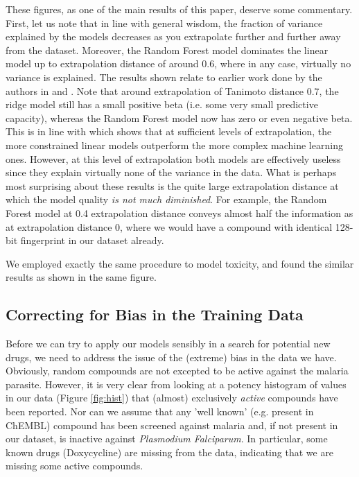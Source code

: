 \documentclass{article}
\begin{document}
These figures, as one of the main results of this paper, deserve some commentary. First, let us note that in line with general wisdom, the fraction of variance explained by the models decreases as you extrapolate further and further away from the dataset.  Moreover, the Random Forest model dominates the linear model up to extrapolation distance of around 0.6, where in any case, virtually no variance is explained.
\newline
\newline
The results shown relate to earlier work done by the authors in \citep{et0:} and \citep{et1:}.  Note that around extrapolation of Tanimoto distance 0.7, the ridge model still has a small positive beta (i.e. some very small predictive capacity), whereas the Random Forest model now has zero or even negative beta.  This is in line with \citep{et1:} which shows that at sufficient levels of extrapolation, the more constrained linear models outperform the more complex machine learning ones.  However, at this level of extrapolation both models are effectively useless since they explain virtually none of the variance in the data.  
\newline
\newline
What is perhaps most surprising about these results is the quite large extrapolation distance at which the model quality \textit{is not much diminished}.  For example, the Random Forest model at 0.4 extrapolation distance conveys almost half the information as at extrapolation distance 0, where we would have a compound with identical 128-bit fingerprint in our dataset already.

We  employed exactly the same procedure to model toxicity, and found the similar results as shown in the same figure.


\subsection{Correcting for Bias in the Training Data}

Before we can try to apply our models sensibly in a search for potential new drugs, we need to address the issue of the (extreme) bias in the data we have.  Obviously, random compounds are not excepted to be active against the malaria parasite.  However, it is very clear from looking at a potency histogram of values in our data (Figure \ref{fig:hist}) that (almost) exclusively \textit{active} compounds have been reported.  Nor can we assume that any 'well known' (e.g. present in ChEMBL) compound has been screened against malaria and, if not present in our dataset, is inactive against \textit{Plasmodium Falciparum}.  In particular, some known drugs (Doxycycline) are missing from the data, indicating that we are missing some active compounds.
\end{document}
